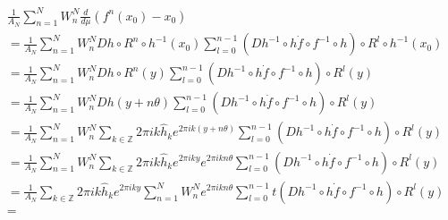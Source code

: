 \documentclass[12pt]{article}
\newcommand{\Z}{\mathbb{Z}}
\newcommand{\hk}{\widehat{h}_k}
\begin{document}
\begin{equation*}\begin{split}
&\frac{1}{A_N} \sum_{n=1}^{N} W_n^N \frac{d}{d\mu} (f^n(x_0)-x_0)\\
& = \frac{1}{A_N} \sum_{n=1}^{N} W_n^N Dh \circ R^n \circ h^{-1} (x_0) \sum_{l=0}^{n-1} \left(Dh^{-1}\circ h \Dot{f}\circ f^{-1}\circ h \right) \circ R^l \circ h^{-1}(x_0) \\
& = \frac{1}{A_N} \sum_{n=1}^{N} W_n^N Dh \circ R^n (y) \sum_{l=0}^{n-1} \left(Dh^{-1}\circ h \Dot{f}\circ f^{-1}\circ h \right) \circ R^l (y) \\
& = \frac{1}{A_N} \sum_{n=1}^{N} W_n^N  Dh (y+n\theta) \sum_{l=0}^{n-1} \left(Dh^{-1}\circ h \Dot{f}\circ f^{-1}\circ h \right) \circ R^l (y)\\
& = \frac{1}{A_N} \sum_{n=1}^{N} W_n^N \sum_{k\in\Z} 2\pi i k \hk e^{2 \pi i k (y+n\theta)} \sum_{l=0}^{n-1} \left( Dh^{-1}\circ h \Dot{f}\circ f^{-1}\circ h \right) \circ R^l (y)\\
& = \frac{1}{A_N} \sum_{n=1}^{N} W_n^N \sum_{k\in\Z} 2\pi i k \hk e^{2 \pi i k y} e^{2 \pi i k n\theta} \sum_{l=0}^{n-1} \left( Dh^{-1}\circ h \Dot{f}\circ f^{-1}\circ h \right) \circ R^l (y) \\
& = \frac{1}{A_N} \sum_{k\in\Z} 2\pi i k \hk e^{2 \pi i k y} \sum_{n=1}^{N} W_n^N e^{2 \pi i k n\theta} \sum_{l=0}^{n-1} t\left( Dh^{-1}\circ h \Dot{f}\circ f^{-1}\circ h \right) \circ R^l (y) \\
& = 
\end{split}\end{equation*}
\end{document}
